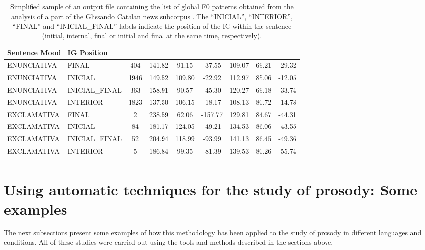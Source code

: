 \documentclass[output=paper]{langsci/langscibook}
\begin{document}
\begin{table}
\begin{tabularx}{\textwidth}{ll *{7}{S}}
\lsptoprule

Sentence Mood & IG Position &  &  &  &  &  &  &  \\
\midrule
ENUNCIATIVA & FINAL & 404 & 141.82 & 91.15 & -37.55 & 109.07 & 69.21 & -29.32\\
ENUNCIATIVA & INICIAL & 1946 & 149.52 & 109.80 & -22.92 & 112.97 & 85.06 & -12.05\\
ENUNCIATIVA & INICIAL\_FINAL & 363 & 158.91 & 90.57 & -45.30 & 120.27 & 69.18 & -33.74\\
ENUNCIATIVA & INTERIOR & 1823 & 137.50 & 106.15 & -18.17 & 108.13 & 80.72 & -14.78\\
EXCLAMATIVA & FINAL & 2 & 238.59 & 62.06 & -157.77 & 129.81 & 84.67 & -44.31\\
EXCLAMATIVA & INICIAL & 84 & 181.17 & 124.05 & -49.21 & 134.53 & 86.06 & -43.55\\
EXCLAMATIVA & INICIAL\_FINAL & 52 & 204.94 & 118.99 & -93.99 & 141.13 & 86.45 & -49.36\\
EXCLAMATIVA & INTERIOR & 5 & 186.84 & 99.35 & -81.39 & 139.53 & 80.26 & -55.74\\

\lspbottomrule
\end{tabularx}
\caption{Simplified sample of an output file containing the list of global F0 patterns obtained from the analysis of a part of the Glissando Catalan news subcorpus \citep{Garrido2013Glissando}. The ``INICIAL'', ``INTERIOR'', ``FINAL'' and ``INICIAL\_FINAL'' labels indicate the position of the IG within the sentence (initial, internal, final or initial and final at the same time, respectively).}
\label{tab:gar:6}
\end{table}

\clearpage
\section{Using automatic techniques for the study of prosody: Some examples}

The next subsections present some examples of how this methodology has been applied to the study of prosody in different languages and conditions. All of these studies were carried out using the tools and methods described in the sections above.
\end{document}
